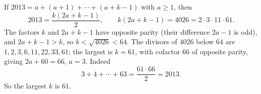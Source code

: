 If $2013=a+(a+1)+\cdots+(a+k-1)$ with $a\ge1$, then
\[2013=\dfrac{k(2a+k-1)}{2},\qquad k(2a+k-1)=4026=2\cdot3\cdot11\cdot61.\]
The factors $k$ and $2a+k-1$ have opposite parity (their difference $2a-1$ is odd), and $2a+k-1>k$, so $k<\sqrt{4026}<64$. The divisors of $4026$ below $64$ are $1,2,3,6,11,22,33,61$; the largest is $k=61$, with cofactor $66$ of opposite parity, giving $2a+60=66$, $a=3$. Indeed
\[3+4+\cdots+63=\dfrac{61\cdot66}{2}=2013.\]
So the largest $k$ is $\boxed{61}$.
